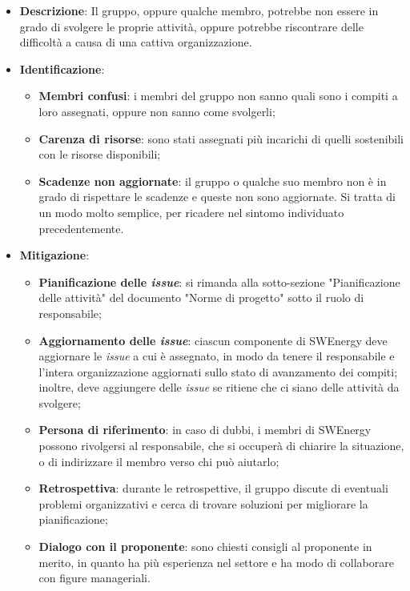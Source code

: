 \label{risk:organizzazione carente}
\begin{itemize}
	\item \textbf{Descrizione}:
	      Il gruppo, oppure qualche membro, potrebbe non essere in grado di
	      svolgere le proprie attività, oppure potrebbe riscontrare delle
	      difficoltà a causa di una cattiva organizzazione.
	\item \textbf{Identificazione}:
	      \begin{itemize}
		      \item \textbf{Membri confusi}: i membri del gruppo non sanno quali
		            sono i compiti a loro assegnati, oppure non sanno come
		            svolgerli;

		      \item \textbf{Carenza di risorse}: sono stati assegnati più
		            incarichi di quelli sostenibili con le risorse disponibili;

		      \item \textbf{Scadenze non aggiornate}: il gruppo o qualche suo
		            membro non è in grado di rispettare le scadenze e queste non
		            sono aggiornate. Si tratta di un modo molto semplice, per
		            ricadere nel sintomo individuato precedentemente.
	      \end{itemize}

	\item \textbf{Mitigazione}:
	      \begin{itemize}
		      \item \textbf{Pianificazione delle \textit{issue}}: si rimanda
		            alla sotto-sezione "Pianificazione delle attività" del
		            documento "Norme di progetto" sotto il ruolo di
		            responsabile;

		      \item \textbf{Aggiornamento delle \textit{issue}}:
		            ciascun componente di SWEnergy deve aggiornare le
		            \textit{issue} a cui è assegnato, in modo da tenere il
		            responsabile e l'intera organizzazione aggiornati sullo
		            stato di avanzamento dei compiti; inoltre, deve aggiungere
		            delle \textit{issue} se ritiene che ci siano delle attività
		            da svolgere;

		      \item \textbf{Persona di riferimento}: in caso di dubbi, i
		            membri di SWEnergy possono rivolgersi
		            al responsabile, che si occuperà di chiarire la situazione,
		            o di indirizzare il membro verso chi può aiutarlo;

		      \item \textbf{Retrospettiva}: durante le retrospettive, il gruppo
		            discute di eventuali problemi organizzativi e cerca di
		            trovare soluzioni per migliorare la pianificazione;

		      \item \textbf{Dialogo con il proponente}: sono chiesti consigli al
		            proponente in merito, in quanto ha più esperienza
		            nel settore e ha modo di collaborare con figure manageriali.
	      \end{itemize}
\end{itemize}
